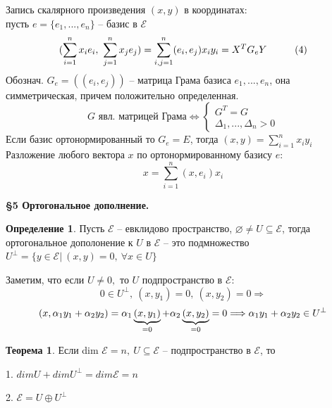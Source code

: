 \documentclass[a4paper, 12pt]{article}
\newcommand\tab[1][.5cm]{\hspace*{#1}}
\theoremstyle{definition}
\newtheorem*{definition}{Определение}
\newtheorem*{theorem}{Теорема}
\begin{document}
    Запись скалярного произведения $(x,y)$ в координатах:\\
    пусть $e = \{e_1,...,e_n\}$ -- базис в $\mathcal{E}$
    $$(\sum\limits_{i=1}^{n} x_ie_i,\ 
    \sum\limits_{j=1}^{n} x_je_j) = 
    \sum\limits_{i,j=1}^{n} (e_i,e_j)x_iy_i = X^TG_eY\tab[1cm] (4)$$
    Обознач. $G_e = ((e_i,e_j))$ -- матрица Грама базиса
    $e_1,...,e_n$, она симметрическая, причем положительно
    определенная.
    $$G \text{ явл. матрицей Грама} \Longleftrightarrow 
    \begin{cases}
        G^T = G\\ \Delta_1,...,\Delta_n > 0
    \end{cases}$$
    Если базис ортонормированный то $G_e = E$, тогда
    $(x,y) = \sum\limits_{i=1}^{n} x_iy_i$\\
    Разложение любого вектора $x$ по ортонормированному 
    базису $e$: $$x = \sum\limits_{i=1}^{n}(x,e_i)x_i$$
    \begin{center}
        \begin{Large}
            \textbf{\S 5 Ортогональное дополнение.}         
        \end{Large}
    \end{center}
    \begin{definition}
        Пусть $\mathcal{E}$ -- евклидово пространство,
        $\varnothing \neq U \subseteq \mathcal{E}$, тогда
        ортогональное дополонение к $U$ в $\mathcal{E}$ -- это 
        подмножество $U^\perp = \{y \in \mathcal{E}|\ 
        (x,y) = 0,\ \forall x \in U\}$ 
    \end{definition}
    Заметим, что если $U \neq 0,$ то $U$ подпространство в
    $\mathcal{E}$:
    $$0\in U^\perp,\ (x,y_1) = 0,\ (x,y_2) = 0 
    \Longrightarrow $$
    $$(x,\alpha_1y_1 + \alpha_2y_2) = \alpha_1\underbrace{(x
    ,y_1)}_{= 0} + \alpha_2\underbrace{(x,y_2)}_{= 0} = 0\\
    \Longrightarrow \alpha_1y_1 + \alpha_2y_2 \in U^\perp$$
    \begin{theorem}
        Если dim $\mathcal{E} = n,\ U \subseteq \mathcal{E}$ --
        подпространство в $\mathcal{E}$, то
        
        1. $dim U + dim U^\perp = dim\mathcal{E} = n$
       
        2. $\mathcal{E} = U \oplus U^\perp$ 
    \end{theorem}
\end{document}
